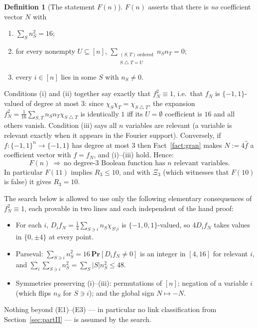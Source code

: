 \documentclass[11pt,reqno]{amsart}
\theoremstyle{plain}
\theoremstyle{definition}
\newtheorem{definition}[theorem]{Definition}
\numberwithin{theorem}{section}
\newcommand{\cube}{\{-1,1\}}
\newcommand{\bits}{\{-1,0,1\}}
\newcommand{\Prb}{\mathbf{Pr}}
\newcommand{\sd}{\mathbin{\triangle}}
\newcommand{\Fhat}[1]{\widehat{#1}}
\newcommand{\XiC}{\Xi}
\begin{document}
\begin{definition}[The statement $F(n)$]
$F(n)$ asserts that there is \emph{no} coefficient vector $N$ with
\begin{enumerate}[label=\textup{(\roman*)}]
  \item $\sum_S n_S^2 = 16$;
  \item for every nonempty $U \subseteq [n]$,
  $\displaystyle\sum_{\substack{(S,T)\ \text{ordered} \\ S \sd T = U}} n_S n_T = 0$;
  \item every $i \in [n]$ lies in some $S$ with $n_S \ne 0$.
\end{enumerate}
\end{definition}

Conditions (i) and (ii) together say exactly that $f_N^2 \equiv 1$, i.e.\ that $f_N$ is
$\cube$-valued of degree at most $3$: since $\chi_S\chi_T = \chi_{S \sd T}$, the expansion
$f_N^2 = \frac1{16}\sum_{S,T} n_S n_T \chi_{S \sd T}$ is identically $1$ iff its $U = \emptyset$
coefficient is $16$ and all others vanish. Condition (iii) says all $n$ variables are relevant
(a variable is relevant exactly when it appears in the Fourier support). Conversely, if
$f \colon \cube^n \to \cube$ has degree at most $3$ then Fact~\ref{fact:gran} makes
$N := 4\Fhat{f}$ a coefficient vector with $f = f_N$, and (i)--(iii) hold. Hence:
\[
  F(n) \ \Longrightarrow\ \text{no degree-3 Boolean function has } n \text{ relevant variables}.
\]
In particular $F(11)$ implies $R_3 \le 10$, and with $\XiC_3$ (which witnesses that $F(10)$ is
false) it gives $R_3 = 10$.

The search below is allowed to use only the following elementary consequences of $f_N^2 \equiv
1$, each provable in two lines and each independent of the hand proof:
\begin{itemize}[leftmargin=1.4em]
  \item[(E1)] For each $i$, $D_i f_N = \frac14\sum_{S \ni i} n_S \chi_{S \setminus i}$ is
  $\bits$-valued, so $4 D_i f_N$ takes values in $\{0, \pm4\}$ at every point.
  \item[(E2)] Parseval: $\sum_{S \ni i} n_S^2 = 16\,\Prb[D_i f_N \ne 0]$ is an integer in
  $[4,16]$ for relevant $i$, and $\sum_i \sum_{S \ni i} n_S^2 = \sum_S |S| n_S^2 \le 48$.
  \item[(E3)] Symmetries preserving (i)--(iii): permutations of $[n]$; negation of a variable
  $i$ (which flips $n_S$ for $S \ni i$); and the global sign $N \mapsto -N$.
\end{itemize}
Nothing beyond (E1)--(E3) --- in particular no link classification from
Section~\ref{sec:partII} --- is assumed by the search.
\end{document}
